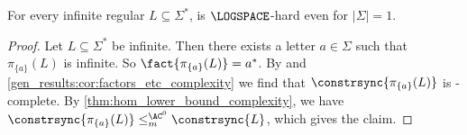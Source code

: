 
\begin{theorem}
	\label{constr_sync:thm:infinite}
	For every infinite regular $L \subseteq \Sigma^*$,
	 is $\LOGSPACE$-hard
	even for $|\Sigma| = 1$.
\end{theorem}
\begin{proof} 
	Let $L \subseteq \Sigma^*$
	be infinite. Then there exists
	a letter $a \in \Sigma$
	such that $\pi_{\{a\}}(L)$ is infinite.
	So $\fact{\pi_{\{a\}}(L)} = a^*$.
	By  and \cref{gen_results:cor:factors_etc_complexity}
	we find that $\constrsync{\pi_{\{a\}}(L)}$
	is \LOGSPACE-complete.
	By \cref{thm:hom_lower_bound_complexity},
	we have $\constrsync{\pi_{\{a\}}(L)} \le_m^{\AC^0} \constrsync{L}$,
	which gives the claim.
\end{proof}